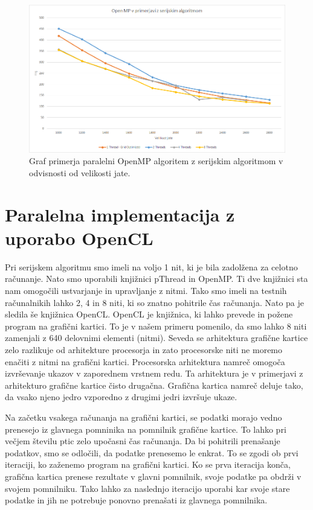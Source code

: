\documentclass[a4paper, 12pt]{book}
\begin{document}
\begin{figure}[t]
\includegraphics[width=\textwidth]{graf_openmp}
\caption{Graf primerja paralelni OpenMP algoritem z serijskim algoritmom v odvisnosti od velikosti jate.}
\label{img:graf_openmp}
\centering
\end{figure}

\chapter{Paralelna implementacija z uporabo OpenCL}
\label{ch4}
Pri serijskem algoritmu smo imeli na voljo 1 nit, ki je bila zadolžena za celotno računanje. Nato smo uporabili knjižnici pThread in OpenMP. Ti dve knjižnici sta nam omogočili ustvarjanje in upravljanje z nitmi. Tako smo imeli na testnih računalnikih lahko 2, 4 in 8 niti, ki so znatno pohitrile čas računanja. Nato pa je sledila še knjižnica OpenCL. OpenCL je knjižnica, ki lahko prevede in požene program na grafični kartici. To je v našem primeru pomenilo, da smo lahko 8 niti zamenjali z 640 delovnimi elementi (nitmi). Seveda se arhitektura grafične kartice zelo razlikuje od arhitekture procesorja in zato procesorske niti ne moremo enačiti z nitmi na grafični kartici. Procesorska arhitektura namreč omogoča izvrševanje ukazov v zaporednem vrstnem redu. Ta arhitektura je v primerjavi z arhitekturo grafične kartice čisto drugačna. Grafična kartica namreč deluje tako, da vsako njeno jedro vzporedno z drugimi jedri izvršuje ukaze. 

Na začetku vsakega računanja na grafični kartici, se podatki morajo vedno prenesejo iz glavnega pomninika na pomnilnik grafične kartice. To lahko pri večjem številu ptic zelo upočasni čas računanja. Da bi pohitrili prenašanje podatkov, smo se odločili, da podatke prenesemo le enkrat. To se zgodi ob prvi iteraciji, ko zaženemo program na grafični kartici. Ko se prva iteracija konča, grafična kartica prenese rezultate v glavni pomnilnik, svoje podatke pa obdrži v svojem pomnilniku. Tako lahko za naslednjo iteracijo uporabi kar svoje stare podatke in jih ne potrebuje ponovno prenašati iz glavnega pomnilnika.
\end{document}
